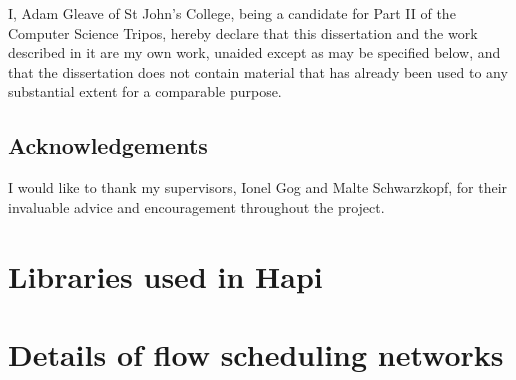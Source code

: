 \documentclass[12pt,a4paper,twoside,notitlepage]{report}
\theoremstyle{plain}
\theoremstyle{definition}
\theoremstyle{remark}
\begin{document}
I, Adam Gleave of St John's College, being a candidate for Part II of the 
Computer Science Tripos, hereby declare that this dissertation and the work 
described in it are my own work, unaided except as may be specified below, and
that the dissertation does not contain material that has already been used to
any substantial extent for a comparable purpose.

\bigskip
{}
\medskip


\clearpage

\tableofcontents

\listofalgorithms
\listoftables
\listoffigures

\newpage
\section*{Acknowledgements}

I would like to thank my supervisors, Ionel Gog and Malte Schwarzkopf, for their invaluable advice and encouragement throughout the project.

\clearpage	%

\setcounter{page}{1}
\pagestyle{headings}



\cleardoublepage


\cleardoublepage


\cleardoublepage


\cleardoublepage


\cleardoublepage

\printbibliography[heading=bibintoc,category=cited]

\appendix
\chapter{Libraries used in Hapi} \label{appendix:tools-libraries}


\chapter{Details of flow scheduling networks} \label{appendix:flow-scheduling}

\end{document}
